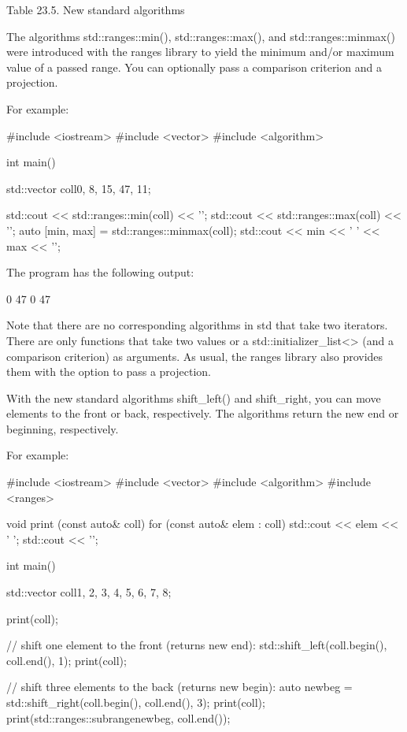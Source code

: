 \begin{center}
Table 23.5. New standard algorithms
\end{center}



The algorithms std::ranges::min(), std::ranges::max(), and std::ranges::minmax() were introduced with the ranges library to yield the minimum and/or maximum value of a passed range. You can optionally pass a comparison criterion and a projection.

For example:


\begin{cpp}
#include <iostream>
#include <vector>
#include <algorithm>

int main()
{
	std::vector coll{0, 8, 15, 47, 11};
	
	std::cout << std::ranges::min(coll) << '\n';
	std::cout << std::ranges::max(coll) << '\n';
	auto [min, max] = std::ranges::minmax(coll);
	std::cout << min << ' ' << max << '\n';
}
\end{cpp}

The program has the following output:

\begin{shell}
0
47
0 47
\end{shell}

Note that there are no corresponding algorithms in std that take two iterators. There are only functions that take two values or a std::initializer\_list<> (and a comparison criterion) as arguments. As usual, the ranges library also provides them with the option to pass a projection.


With the new standard algorithms shift\_left() and shift\_right, you can move elements to the front or back, respectively. The algorithms return the new end or beginning, respectively.

For example:


\begin{cpp}
#include <iostream>
#include <vector>
#include <algorithm>
#include <ranges>

void print (const auto& coll)
{
	for (const auto& elem : coll) {
		std::cout << elem << ' ';
	}
	std::cout << '\n';
}

int main()
{
	std::vector coll{1, 2, 3, 4, 5, 6, 7, 8};
	
	print(coll);
	
	// shift one element to the front (returns new end):
	std::shift_left(coll.begin(), coll.end(), 1);
	print(coll);
	
	// shift three elements to the back (returns new begin):
	auto newbeg = std::shift_right(coll.begin(), coll.end(), 3);
	print(coll);
	print(std::ranges::subrange{newbeg, coll.end()});
}
\end{cpp}

